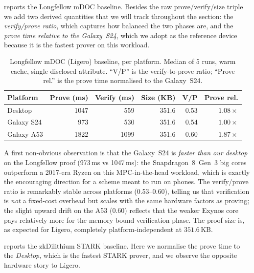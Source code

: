 \documentclass{article}
\begin{document}
 reports the Longfellow mDOC baseline. Besides the raw
prove/verify/size triple we add two derived quantities that we will track
throughout the section: the \emph{verify/prove ratio}, which captures how
balanced the two phases are, and the \emph{prove time relative to the
Galaxy~S24}, which we adopt as the reference device because it is the
fastest prover on this workload.

\begin{table}[ht]
  \centering
  \caption{Longfellow mDOC (Ligero) baseline, per platform. Median of 5 runs,
  warm cache, single disclosed attribute. ``V/P'' is the verify-to-prove ratio;
  ``Prove rel.'' is the prove time normalised to the Galaxy~S24.}
  \label{tab:res-base-ligero}
  \small
  \begin{tabular}{@{}lrrrrr@{}}
    \toprule
    \textbf{Platform} & \textbf{Prove (ms)} & \textbf{Verify (ms)} & \textbf{Size (KB)} & \textbf{V/P} & \textbf{Prove rel.} \\
    \midrule
    Desktop    & 1047 & 559  & 351.6 & 0.53 & $1.08\times$ \\
    Galaxy S24 & 973  & 530  & 351.6 & 0.54 & $1.00\times$ \\
    Galaxy A53 & 1822 & 1099 & 351.6 & 0.60 & $1.87\times$ \\
    \bottomrule
  \end{tabular}
\end{table}

A first non-obvious observation is that the Galaxy~S24 is \emph{faster than our
desktop} on the Longfellow proof (973\,ms vs 1047\,ms): the Snapdragon~8~Gen~3
big cores outperform a 2017-era Ryzen on this MPC-in-the-head workload, which is
exactly the encouraging direction for a scheme meant to run on phones. The
verify/prove ratio is remarkably stable across platforms (0.53--0.60), telling us
that verification is \emph{not} a fixed-cost overhead but scales with the same
hardware factors as proving; the slight upward drift on the A53 (0.60) reflects
that the weaker Exynos core pays relatively more for the memory-bound verification
phase. The proof size is, as expected for Ligero, completely
platform-independent at $351.6$\,KB.

 reports the zkDilithium STARK baseline. Here we
normalise the prove time to the \emph{Desktop}, which is the fastest STARK prover,
and we observe the opposite hardware story to Ligero.
\end{document}
